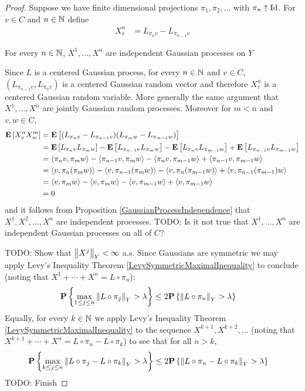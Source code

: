 \begin{proof}
Suppose we have finite dimensional projections $\pi_1, \pi_2, \dotsc$ with $\pi_n \uparrow \operatorname*{Id}$.  For $v \in C$ and $n \in \mathbb{N}$ define
\begin{align*}
X^n_v &= L_{\pi_n v} - L_{\pi_{n-1} v}
\end{align*}

\begin{clm}For every $n \in \mathbb{N}$, $X^1, \dotsc, X^n$ are independent Gaussian processes on $Y$
\end{clm}
Since $L$ is a centered Gaussian process, for every $n \in \mathbb{N}$ and $v \in C$, $( L_{\pi_{n-1} v},  L_{\pi_{n} v})$ is a centered Gaussian random vector  and therefore $X^n_v$ is a centered Gaussian random variable.  More generally the same argument that $X^1, \dotsc, X^n$ are jointly Gaussian random processes.  Moreover for $m < n$ and $v,w \in C$,
\begin{align*}
\textbf{E}\left[X^n_v X^m_w\right] &= \textbf{E}\left[(L_{\pi_n v} - L_{\pi_{n-1} v}) (L_{\pi_m w} - L_{\pi_{m-1} w})\right] \\
&=\textbf{E}\left[L_{\pi_n v}L_{\pi_m w}\right] - \textbf{E}\left[L_{\pi_{n-1} v}L_{\pi_m w}\right] - \textbf{E}\left[L_{\pi_n v}L_{\pi_{m-1} w}\right] + \textbf{E}\left[L_{\pi_{n-1} v}L_{\pi_{m-1} w}\right] \\
&=\langle \pi_n v, \pi_m w \rangle - \langle \pi_{n-1} v, \pi_m w \rangle - \langle \pi_n v, \pi_{m-1} w \rangle + \langle \pi_{n-1} v, \pi_{m-1} w \rangle \\
&=\langle v, \pi_n (\pi_m w) \rangle - \langle v, \pi_{n-1}(\pi_m w) \rangle - \langle v, \pi_n(\pi_{m-1} w) \rangle + \langle v, \pi_{n-1}(\pi_{m-1}) w \rangle \\
&=\langle v, \pi_m w \rangle - \langle v, \pi_m w \rangle - \langle v, \pi_{m-1} w \rangle + \langle v, \pi_{m-1} w \rangle \\
&=0
\end{align*}
and it follows from Proposition \ref{GaussianProcessIndependence} that $X^1, X^2, \dotsc, X^n$ are independent processes.  TODO: Is it not true that $X^1, \dotsc, X^n$ are independent Gaussian processes on all of $C$?

TODO: Show that $\left \lVert X^j \right \rVert_Y < \infty$ a.s.
Since Gaussians are symmetric we may apply Levy's Inequality Theorem \ref{LevySymmetricMaximalInequality} to conclude (noting that $X^1 + \dotsb + X^n = L \circ \pi_n$):
\begin{align*}
\textbf{P}\left \{\max_{1 \leq j \leq n} \left \lVert L \circ \pi_j \right \rVert_Y > \lambda \right \} &\leq 2 \textbf{P}\left \{\left \lVert L \circ \pi_n \right \rVert_Y > \lambda \right \}
\end{align*}
Equally, for every $k \in \mathbb{N}$ we apply Levy's Inequality Theorem \ref{LevySymmetricMaximalInequality} to the sequence $X^{k+1}, X^{k+2}, \dotsc$ (noting that
$X^{k+1} + \dotsb + X^n = L \circ \pi_n - L \circ \pi_k$) to see that for all $n > k$,
\begin{align*}
\textbf{P}\left \{\max_{k \leq j \leq n} \left \lVert L \circ \pi_j - L \circ \pi_k \right \rVert_Y > \lambda \right \} &\leq 2 \textbf{P}\left \{\left \lVert L \circ \pi_n - L \circ \pi_k \right \rVert_Y > \lambda \right \}
\end{align*}
TODO: Finish
\end{proof}


